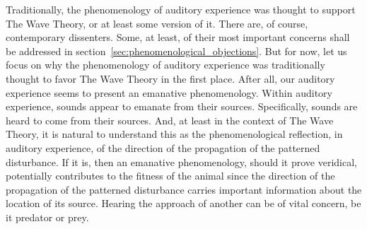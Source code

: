 Traditionally, the phenomenology of auditory experience was thought to support The Wave Theory, or at least some version of it. There are, of course, contemporary dissenters. Some, at least, of their most important concerns shall be addressed in section~\ref{sec:phenomenological_objections}. But for now, let us focus on why the phenomenology of auditory experience was traditionally thought to favor The Wave Theory in the first place. After all, our auditory experience seems to present an emanative phenomenology. Within auditory experience, sounds appear to emanate from their sources. Specifically, sounds are heard to come from their sources. And, at least in the context of The Wave Theory, it is natural to understand this as the phenomenological reflection, in auditory experience, of the direction of the propagation of the patterned disturbance. If it is, then an emanative phenomenology, should it prove veridical, potentially contributes to the fitness of the animal since the direction of the propagation of the patterned disturbance carries important information about the location of its source. Hearing the approach of another can be of vital concern, be it predator or prey.

